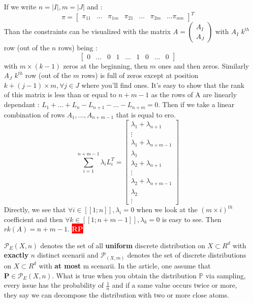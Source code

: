 \documentclass{amsart}
\newcommand{\nb}[3]{
		{\colorbox{#2}{\bfseries\sffamily\tiny\textcolor{white}{#1}}}
		{\textcolor{#2}{\text{$\blacktriangleright$}{\textcolor{#2}{#3}}\text{$\blacktriangleleft$}}}}
\newcommand{\rp}[1]{\nb{RP}{red}{#1}}
\begin{document}
If we write $n=|I|, m=|J|$ and :
$$
\pi=\begin{bmatrix}
    \pi_{11}& \hdots&\pi_{1m}&\pi_{21}&\hdots&\pi_{2m}&\hdots\pi_{nm}
\end{bmatrix}^T
$$
Than the constraints can be visualized with the matrix $A=\begin{pmatrix}
    A_I \\
    A_J
\end{pmatrix}$ with $A_I$ $k^{th}$ row (out of the $n$ rows) being : 
$$\begin{bmatrix}
    0&\hdots&0&1&\hdots&1&0&\hdots&0
\end{bmatrix}$$
with $m\times(k-1)$ zeros at the beginning, then $m$ ones and then zeros. 
\newline
Similarly $A_J$ $k^{th}$ row (out of the $m$ rows) is full of zeros except at position $k+(j-1)\times m, \forall j\in J$ where you'll find ones. It's easy to show that the rank of this matrix is less than or equal to $n+m-1$ as the rows of A are linearly dependant : $L_1+...+L_n-L_{n+1}-...-L_{n+m}=0$. Then if we take a linear combination of rows $A_1,...,A_{n+m-1}$ that is equal to ero. $$
\sum_{i=1}^{n+m-1}\lambda_iL_i^T=\begin{bmatrix}
    \lambda_1+\lambda_{n+1}\\ \vdots\\ \lambda_1+\lambda_{n+m-1}\\ \lambda_{1} \\ \lambda_2+\lambda_{n+1} \\ \vdots \\ \lambda_2+\lambda_{n+m-1}\\ \lambda_2  \\ \vdots
\end{bmatrix}
$$
Directly, we see that $\forall i \in [\![1;n]\!], \lambda_i=0$ when we look at the $(m\times i)^{th}$ coefficient and then $\forall k\in[\![1;n+m-1]\!], \lambda_k=0$ is easy to see. Then $rk(A)=n+m-1$. \rp{kind of useless as we know that the number of variables in basis is $n+m$ (number of constraints) but can be the starting point of sparsity explanation if I study regularization as Benoît mentionned}
\newline

$\mathcal{P}_E(X,n)$ denotes the set of all \textbf{uniform} discrete distribution on $X\subset R^d$ with \textbf{exactly} $n$ distinct scenarii and $\mathcal{P}_(X,m)$ denotes the set of discrete distributions on $X\subset R^d$ with \textbf{at most} m scenarii. In the article, one assume that $\mathbf{P}\in\mathcal{P}_E(X,n)$. What is true when you obtain the distribution $\mathbb{P}$ via sampling, every issue has the probability of $\frac{1}{n}$ and if a same value occurs twice or more, they say we can decompose the distribution with two or more close atoms.
\end{document}
